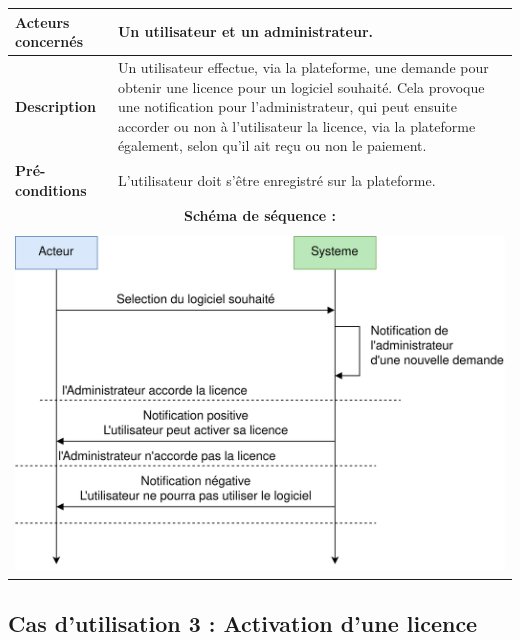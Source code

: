 \begin{table}[!h]
	\centering
	\begin{tabular}{| m{4cm} | m{12cm} |}
		\hline
		    \textbf{Acteurs concernés} & Un utilisateur et un administrateur. \\
		\hline
		    \textbf{Description} & Un utilisateur effectue, via la plateforme, une demande pour obtenir une licence pour un logiciel souhaité. Cela provoque une notification pour l'administrateur, qui peut ensuite accorder ou non à l'utilisateur la licence, via la plateforme également, selon qu'il ait reçu ou non le paiement. \\
		\hline
		    \textbf{Pré-conditions} & L'utilisateur doit s'être enregistré sur la plateforme.\\
		\hline
		    \multicolumn{2}{|c|}{\textbf{Schéma de séquence :}} \\
		\hline
		    \multicolumn{2}{|c|}{}\\
		    \multicolumn{2}{|c|}{\includegraphics[width=15cm]{main/png/seq_demande.png}} \\
		\hline
	\end{tabular}
	\label{tab:tab2}
\end{table}
\newpage

\subsection{Cas d'utilisation 3 : Activation d'une licence}

